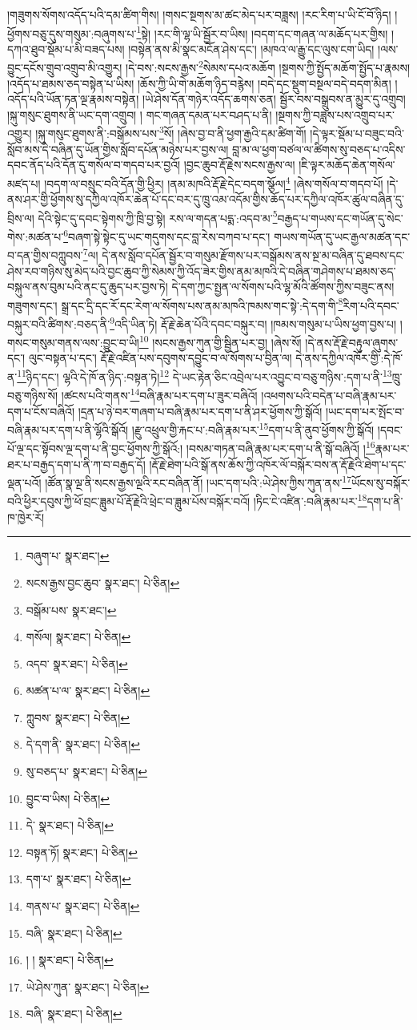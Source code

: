 །གཟུགས་སོགས་འདོད་པའི་དམ་ཚིག་གིས། །གསང་སྔགས་མ་ཚང་མེད་པར་བཟླས། །རང་རིག་པ་ཡི་ངོ་བོ་ཉིད། །ཕྱོགས་བཅུ་དུས་གསུམ་:བཞུགས་པ་\footnote{བཞུག་པ་  སྣར་ཐང་། }སྟེ། །རང་གི་ལྷ་ཡི་སྦྱོར་བ་ཡིས། །བདག་དང་གཞན་ལ་མཆོད་པར་གྱིས། །དཀའ་ཐུབ་སྡོམ་པ་མི་བཟད་པས། །བསྟེན་ནས་མི་སྣང་མངོན་ཤེས་དང་། །མཁའ་ལ་རྒྱུ་དང་ལུས་ངག་ཡིད། །ལས་བྱུང་དངོས་གྲུབ་འགྲུབ་མི་འགྱུར། །དེ་བས་:སངས་རྒྱས་\footnote{སངས་རྒྱས་བྱང་ཆུབ་  སྣར་ཐང་།  པེ་ཅིན། }སེམས་དཔའ་མཆོག །སྔགས་ཀྱི་སྤྱོད་མཆོག་སྤྱོད་པ་རྣམས། །འདོད་པ་ཐམས་ཅད་བསྟེན་པ་ཡིས། །ཆོས་ཀྱི་ཡི་གེ་མཆོག་ཉིད་བརྙེས། །བདེ་དང་སྡུག་བསྔལ་བདེ་བདག་མིན། །འདོད་པའི་ཡོན་ཏན་ལྔ་རྣམས་བསྟེན། །ཡེ་ཤེས་དོན་གཉེར་འདོད་ཆགས་ཅན། སྦྱོར་བས་བསྒྲུབས་ན་མྱུར་དུ་འགྲུབ། །སྐུ་གསུང་ཐུགས་ནི་ཡང་དག་འགྲུབ། །
གང་གཞན་དམན་པར་བཤད་པ་ནི། །སྔགས་ཀྱི་བཟླས་པས་འགྲུབ་པར་འགྱུར། །སྐུ་གསུང་ཐུགས་ནི་:བསྒོམས་པས་\footnote{བསྒོམ་པས་  སྣར་ཐང་། }སོ། །ཞེས་བྱ་བ་ནི་ཕྱག་རྒྱའི་དམ་ཚིག་གོ། །དེ་ལྟར་སྡོམ་པ་བཟུང་བའི་སློབ་མས་དེ་བཞིན་དུ་ཡོན་གྱིས་སློབ་དཔོན་མཉེས་པར་བྱས་ལ། བླ་མ་ལ་ཕྱག་བཙལ་ལ་ཚིགས་སུ་བཅད་པ་འདིས་དབང་ནོད་པའི་དོན་དུ་གསོལ་བ་གདབ་པར་བྱའོ། །བྱང་ཆུབ་རྡོ་རྗེས་སངས་རྒྱས་ལ། །ཇི་ལྟར་མཆོད་ཆེན་གསོལ་མཛད་པ། །བདག་ལ་བསྲུང་བའི་དོན་གྱི་ཕྱིར། །ནམ་མཁའི་རྡོ་རྗེ་དེང་བདག་སྩོལ།\footnote{གསོལ།  སྣར་ཐང་།  པེ་ཅིན། } །ཞེས་གསོལ་བ་གདབ་པོ། །དེ་ནས་ཤར་གྱི་ཕྱོགས་སུ་དཀྱིལ་འཁོར་ཆེན་པོ་དང་བར་དུ་ཁྲུ་འམ་འདོམ་གྱིས་ཆོད་པར་དཀྱིལ་འཁོར་ཚུལ་བཞིན་དུ་བྲིས་ལ། དེའི་སྟེང་དུ་དབང་སྟེགས་ཀྱི་ཁྲི་བྱ་སྟེ། རས་ལ་གདན་པདྨ་:འདབ་མ་\footnote{འདབ་  སྣར་ཐང་།  པེ་ཅིན། }བརྒྱད་པ་གཡས་དང་གཡོན་དུ་སེང་གེས་:མཚན་པ་\footnote{མཚན་པ་ལ་  སྣར་ཐང་།  པེ་ཅིན། }བཞག་སྟེ་སྟེང་དུ་ཡང་གདུགས་དང་བླ་རེས་བཀབ་པ་དང་། གཡས་གཡོན་དུ་ཡང་རྒྱལ་མཚན་དང་བ་དན་གྱིས་བཀླུབས་\footnote{ཀླུབས་  སྣར་ཐང་།  པེ་ཅིན། }ལ། དེ་ནས་སློབ་དཔོན་སྦྱོར་བ་གསུམ་རྫོགས་པར་བསྒོམས་ནས་སྔ་མ་བཞིན་དུ་ཐབས་དང་ཤེས་རབ་གཉིས་སུ་མེད་པའི་བྱང་ཆུབ་ཀྱི་སེམས་ཀྱི་འོད་ཟེར་གྱིས་ནམ་མཁའི་དེ་བཞིན་གཤེགས་པ་ཐམས་ཅད་བསྐུལ་ནས་བུམ་པའི་ནང་དུ་ཆུད་པར་བྱས་ཏེ། དེ་དག་ཀྱང་སྤྱན་ལ་སོགས་པའི་ལྷ་མོའི་ཚོགས་ཀྱིས་བཟུང་ནས། གཟུགས་དང་། སྒྲ་དང་དྲི་དང་རོ་དང་རེག་ལ་སོགས་པས་ནམ་མཁའི་ཁམས་གང་སྟེ་:དེ་དག་གི་\footnote{དེ་དག་ནི་  སྣར་ཐང་།  པེ་ཅིན། }རིག་པའི་དབང་བསྐུར་བའི་ཚིགས་:བཅད་ནི་\footnote{སུ་བཅད་པ་  སྣར་ཐང་།  པེ་ཅིན། }འདི་ཡིན་ཏེ། རྡོ་རྗེ་ཆེན་པོའི་དབང་བསྐུར་བ། །ཁམས་གསུམ་པ་ཡིས་ཕྱག་བྱས་པ། །གསང་གསུམ་གནས་ལས་:བྱུང་བ་ཡི།\footnote{བྱུང་བ་ཡིས།  པེ་ཅིན། } །སངས་རྒྱས་ཀུན་གྱི་སྦྱིན་པར་བྱ། །ཞེས་སོ། །དེ་ནས་རྡོ་རྗེ་བརྟུལ་ཞུགས་དང་། ལུང་བསྟན་པ་དང་། རྡོ་རྗེ་འཛིན་པས་དབུགས་དབྱུང་བ་ལ་སོགས་པ་བྱིན་ལ། དེ་ནས་དཀྱིལ་འཁོར་གྱི་:དེ་ཁོ་ན་\footnote{དེ་  སྣར་ཐང་།  པེ་ཅིན། }ཉིད་དང་། ལྷའི་དེ་ཁོ་ན་ཉིད་:བསྟན་ཏེ།\footnote{བསྟན་ཏོ།  སྣར་ཐང་།  པེ་ཅིན། } དེ་ཡང་རྟེན་ཅིང་འབྲེལ་པར་འབྱུང་བ་བཅུ་གཉིས་:དག་པ་ནི་\footnote{དག་པ་  སྣར་ཐང་།  པེ་ཅིན། }ཁྲུ་བཅུ་གཉིས་སོ། །ཚངས་པའི་གནས་\footnote{གནས་པ་  སྣར་ཐང་།  པེ་ཅིན། }བཞི་རྣམ་པར་དག་པ་ཟུར་བཞིའོ། །འཕགས་པའི་བདེན་པ་བཞི་རྣམ་པར་དག་པ་ངོས་བཞིའོ། །དྲན་པ་ཉེ་བར་གཞག་པ་བཞི་རྣམ་པར་དག་པ་ནི་ཤར་ཕྱོགས་ཀྱི་སྒོའོ། །ཡང་དག་པར་སྤོང་བ་བཞི་རྣམ་པར་དག་པ་ནི་ལྷོའི་སྒོའོ། །རྫུ་འཕྲུལ་གྱི་རྐང་པ་:བཞི་རྣམ་པར་\footnote{བཞི་  སྣར་ཐང་།  པེ་ཅིན། }དག་པ་ནི་ནུབ་ཕྱོགས་ཀྱི་སྒོའོ། །དབང་པོ་ལྔ་དང་སྟོབས་ལྔ་དག་པ་ནི་བྱང་ཕྱོགས་ཀྱི་སྒོའོ:། །བསམ་གཏན་བཞི་རྣམ་པར་དག་པ་ནི་སྒོ་བཞིའོ། །\footnote{། །  སྣར་ཐང་།  པེ་ཅིན། }རྣམ་པར་ཐར་པ་བརྒྱད་དག་པ་ནི་ཀ་བ་བརྒྱད་དོ། །རྡོ་རྗེ་ཐེག་པའི་སྒོ་ནས་ཆོས་ཀྱི་འཁོར་ལོ་བསྐོར་བས་ན་རྡོ་རྗེའི་ཐེག་པ་དང་ལྡན་པའོ། །ཚོན་སྣ་ལྔ་ནི་སངས་རྒྱས་ལྔའི་རང་བཞིན་ནོ། །ཡང་དག་པའི་:ཡེ་ཤེས་ཀྱིས་ཀུན་ནས་\footnote{ཡེ་ཤེས་ཀུན་  སྣར་ཐང་།  པེ་ཅིན། }ཡོངས་སུ་བསྐོར་བའི་ཕྱིར་དབུས་ཀྱི་ཕོ་བྲང་ཟླུམ་པོ་རྡོ་རྗེའི་ཕྲེང་བ་ཟླུམ་པོས་བསྐོར་བའོ། །ཏིང་ངེ་འཛིན་:བཞི་རྣམ་པར་\footnote{བཞི་  སྣར་ཐང་།  པེ་ཅིན། }དག་པ་ནི་ཁ་ཁྱེར་རོ། 